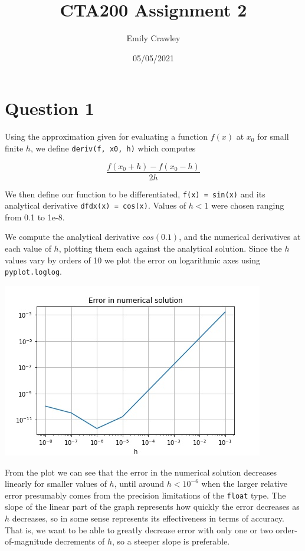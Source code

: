 \documentclass{article}
\title{CTA200 Assignment 2}
\author{Emily Crawley}
\date{05/05/2021}
\begin{document}
\maketitle

\section*{Question 1}

Using the approximation given for evaluating a function $f(x)$ at $x_0$ for small finite $h$, we define \texttt{deriv(f, x0, h)} which computes

$$ \frac{f(x_0 + h) - f(x_0 - h)}{2h} $$

We then define our function to be differentiated, \texttt{f(x) = sin(x)} and its analytical derivative \texttt{dfdx(x) = cos(x)}. Values of $h < 1$ were chosen ranging from 0.1 to 1e-8.

We compute the analytical derivative $cos(0.1)$, and the numerical derivatives at each value of $h$, plotting them each against the analytical solution. Since the $h$ values vary by orders of 10 we plot the error on logarithmic axes using \texttt{pyplot.loglog}.

\includegraphics[scale=0.75]{plot1}

From the plot we can see that the error in the numerical solution decreases linearly for smaller values of $h$, until around $h < 10^{-6}$ when the larger relative error presumably comes from the precision limitations of the \texttt{float} type. The slope of the linear part of the graph represents how quickly the error decreases as $h$ decreases, so in some sense represents its effectiveness in terms of accuracy. That is, we want to be able to greatly decrease error with only one or two order-of-magnitude decrements of $h$, so a steeper slope is preferable.
\end{document}
